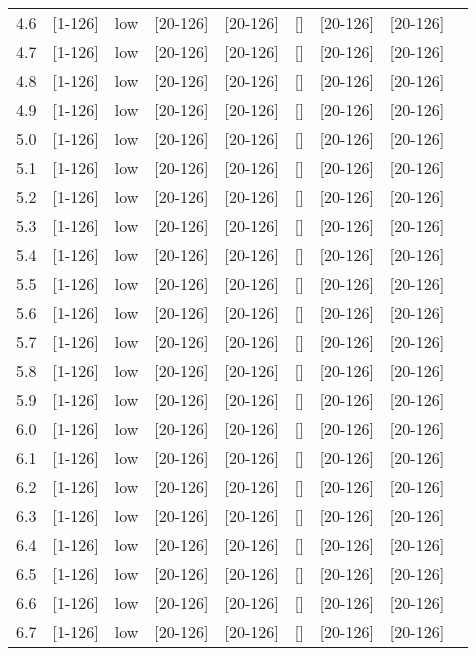 \documentclass[11pt]{article}
\begin{document}
\begin{tabular}{| l | l | l | l | l | l | l | l | l |}
      4.6 & [1-126] & low & [20-126] & [20-126] & [] & [20-126] & [20-126] &\\
      4.7 & [1-126] & low & [20-126] & [20-126] & [] & [20-126] & [20-126] &\\
      4.8 & [1-126] & low & [20-126] & [20-126] & [] & [20-126] & [20-126] &\\
      4.9 & [1-126] & low & [20-126] & [20-126] & [] & [20-126] & [20-126] &\\
      5.0 & [1-126] & low & [20-126] & [20-126] & [] & [20-126] & [20-126] &\\
      5.1 & [1-126] & low & [20-126] & [20-126] & [] & [20-126] & [20-126] &\\
      5.2 & [1-126] & low & [20-126] & [20-126] & [] & [20-126] & [20-126] &\\
      5.3 & [1-126] & low & [20-126] & [20-126] & [] & [20-126] & [20-126] &\\
      5.4 & [1-126] & low & [20-126] & [20-126] & [] & [20-126] & [20-126] &\\
      5.5 & [1-126] & low & [20-126] & [20-126] & [] & [20-126] & [20-126] &\\
      5.6 & [1-126] & low & [20-126] & [20-126] & [] & [20-126] & [20-126] &\\
      5.7 & [1-126] & low & [20-126] & [20-126] & [] & [20-126] & [20-126] &\\
      5.8 & [1-126] & low & [20-126] & [20-126] & [] & [20-126] & [20-126] &\\
      5.9 & [1-126] & low & [20-126] & [20-126] & [] & [20-126] & [20-126] &\\
      6.0 & [1-126] & low & [20-126] & [20-126] & [] & [20-126] & [20-126] &\\
      6.1 & [1-126] & low & [20-126] & [20-126] & [] & [20-126] & [20-126] &\\
      6.2 & [1-126] & low & [20-126] & [20-126] & [] & [20-126] & [20-126] &\\
      6.3 & [1-126] & low & [20-126] & [20-126] & [] & [20-126] & [20-126] &\\
      6.4 & [1-126] & low & [20-126] & [20-126] & [] & [20-126] & [20-126] &\\
      6.5 & [1-126] & low & [20-126] & [20-126] & [] & [20-126] & [20-126] &\\
      6.6 & [1-126] & low & [20-126] & [20-126] & [] & [20-126] & [20-126] &\\
      6.7 & [1-126] & low & [20-126] & [20-126] & [] & [20-126] & [20-126] &\\

\end{tabular}
\end{document}
